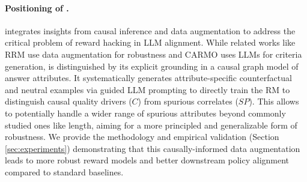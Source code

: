 \paragraph{Positioning of \carma.}
\carma{} integrates insights from causal inference and data augmentation to address the critical problem of reward hacking in LLM alignment. While related works like RRM \citep{liu2024rrm} use data augmentation for robustness and CARMO \citep{gupta2025carmodynamiccriteriageneration} uses LLMs for criteria generation, \carma{} is distinguished by its explicit grounding in a causal graph model of answer attributes. It systematically generates attribute-specific counterfactual and neutral examples via guided LLM prompting to directly train the RM to distinguish causal quality drivers ($C$) from spurious correlates ($SP$). This allows \carma{} to potentially handle a wider range of spurious attributes beyond commonly studied ones like length, aiming for a more principled and generalizable form of robustness. We provide the methodology and empirical validation (Section \ref{sec:experiments}) demonstrating that this causally-informed data augmentation leads to more robust reward models and better downstream policy alignment compared to standard baselines.